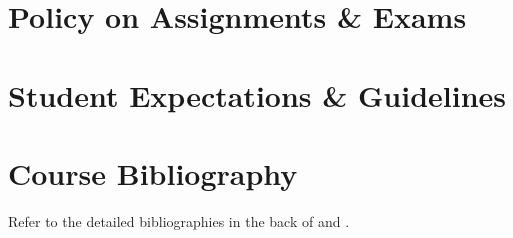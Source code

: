 \documentclass[titlepage]{article}
\newcommand\policy{../policy}
\begin{document}


\section{Policy on Assignments \& Exams}
\label{policy}





\section{Student Expectations \& Guidelines}
\label{expectations}







\section{Course Bibliography}
\label{bibliography}

Refer to the detailed bibliographies in the back of \cite{Christianson}
and \cite{Dell}.
\end{document}
